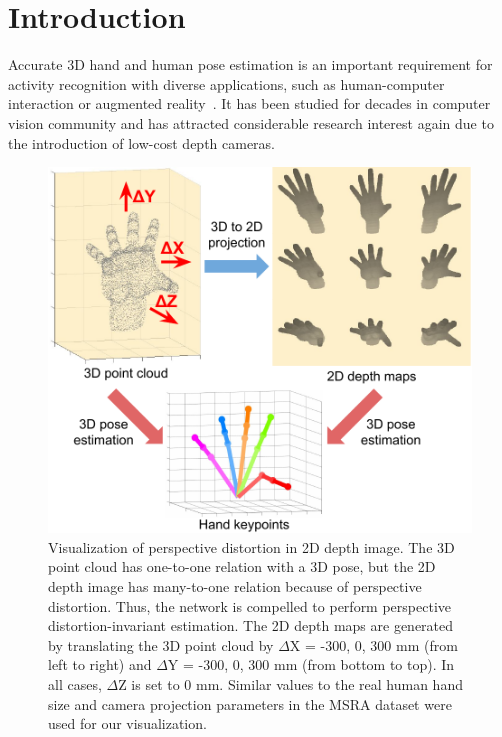 \section{Introduction}

Accurate 3D hand and human pose estimation is an important requirement for activity recognition with diverse applications, such as human-computer interaction or augmented reality~\cite{romero2009monocular}. It has been studied for decades in computer vision community and has attracted considerable research interest again due to the introduction of low-cost depth cameras.

\begin{figure}[t]
\begin{center}
   \includegraphics[width=1.0\linewidth]{weakness_of_prev.pdf}
\end{center}
\vspace*{-5mm}
   \caption{Visualization of perspective distortion in 2D depth image. The 3D point cloud has one-to-one relation with a 3D pose, but the 2D depth image has many-to-one relation because of perspective distortion. Thus, the network is compelled to perform perspective distortion-invariant estimation. The 2D depth maps are generated by translating the 3D point cloud by $\Delta$X = -300, 0, 300 mm (from left to right) and $\Delta$Y = -300, 0, 300 mm (from bottom to top). In all cases, $\Delta$Z is set to 0 mm. Similar values to the real human hand size and camera projection parameters in the MSRA dataset were used for our visualization.}
\vspace*{-3mm}
\label{fig:weakness_of_prev}
\end{figure}

